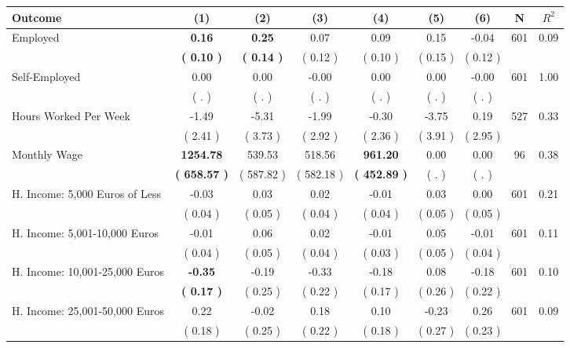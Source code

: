 \begin{tabular}{lcccccccc}
\toprule
 \textbf{Outcome} & \textbf{(1)} & \textbf{(2)} & \textbf{(3)} & \textbf{(4)} & \textbf{(5)} & \textbf{(6)} & \textbf{N} & \textbf{$ R^2$} \\
\midrule
Employed & \textbf{     0.16} & \textbf{     0.25} &      0.07 &      0.09 &      0.15 &     -0.04 & 601 &       0.09 \\ 
 & \textbf{(     0.10 )} & \textbf{(     0.14 )} & (     0.12 ) & (     0.10 ) & (     0.15 ) & (     0.12 ) & \\
Self-Employed &      0.00 &      0.00 &     -0.00 &      0.00 &      0.00 &     -0.00 & 601 &       1.00 \\ 
 & (        . ) & (        . ) & (        . ) & (        . ) & (        . ) & (        . ) & \\
Hours Worked Per Week &     -1.49 &     -5.31 &     -1.99 &     -0.30 &     -3.75 &      0.19 & 527 &       0.33 \\ 
 & (     2.41 ) & (     3.73 ) & (     2.92 ) & (     2.36 ) & (     3.91 ) & (     2.95 ) & \\
Monthly Wage & \textbf{  1254.78} &    539.53 &    518.56 & \textbf{   961.20} &      0.00 &      0.00 & 96 &       0.38 \\ 
 & \textbf{(   658.57 )} & (   587.82 ) & (   582.18 ) & \textbf{(   452.89 )} & (        . ) & (        . ) & \\
H. Income: 5,000 Euros of Less &     -0.03 &      0.03 &      0.02 &     -0.01 &      0.03 &      0.00 & 601 &       0.21 \\ 
 & (     0.04 ) & (     0.05 ) & (     0.04 ) & (     0.04 ) & (     0.05 ) & (     0.05 ) & \\
H. Income: 5,001-10,000 Euros &     -0.01 &      0.06 &      0.02 &     -0.01 &      0.05 &     -0.01 & 601 &       0.11 \\ 
 & (     0.04 ) & (     0.05 ) & (     0.04 ) & (     0.03 ) & (     0.05 ) & (     0.04 ) & \\
H. Income: 10,001-25,000 Euros & \textbf{    -0.35} &     -0.19 &     -0.33 &     -0.18 &      0.08 &     -0.18 & 601 &       0.10 \\ 
 & \textbf{(     0.17 )} & (     0.25 ) & (     0.22 ) & (     0.17 ) & (     0.26 ) & (     0.22 ) & \\
H. Income: 25,001-50,000 Euros &      0.22 &     -0.02 &      0.18 &      0.10 &     -0.23 &      0.26 & 601 &       0.09 \\ 
 & (     0.18 ) & (     0.25 ) & (     0.22 ) & (     0.18 ) & (     0.27 ) & (     0.23 ) & \\

\end{tabular}
